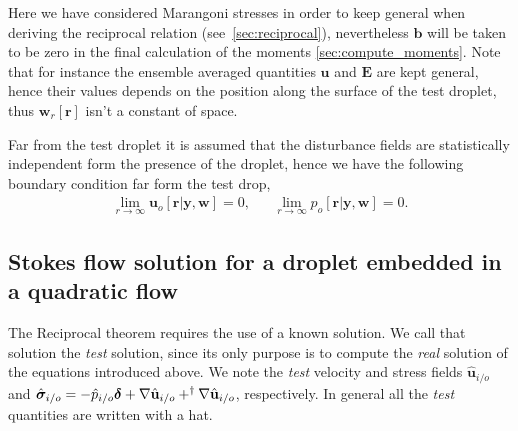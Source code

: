 Here we have considered Marangoni stresses in order to keep general when deriving the reciprocal relation (see~\ref{sec:reciprocal}), nevertheless $\textbf{b}$ will be taken to be zero in the final calculation of the moments \eqref{sec:compute_moments}. 
Note that for instance the ensemble averaged quantities $\textbf{u}$ and $\textbf{E}$ are kept general, hence their values depends on the position along the surface of the test droplet, thus $\textbf{w}_r[\textbf{r}]$ isn't a constant of space. 



Far from the test droplet it is assumed that the disturbance fields are statistically independent form the presence of the droplet, hence we have the following boundary condition far form the test drop,  
\begin{align}
    \lim_{r \to\infty }\textbf{u}_{o}[\textbf{r}|\textbf{y},\textbf{w}] = 0,
    && \lim_{r \to\infty }p_{o}[\textbf{r}|\textbf{y},\textbf{w}]= 0. 
    \label{eq:BC_r_infty_1}
\end{align}





\subsection{Stokes flow solution for a droplet embedded in a quadratic flow}
The Reciprocal theorem requires the use of a known solution.
We call that solution the \textit{test} solution, since its only purpose is to compute the \textit{real} solution of the equations introduced above. 
We note the \textit{test} velocity and stress fields $\hat{\textbf{u}}_{i/o}$ and $\hat{\bm\sigma}_{i/o} = - \hat{p}_{i/o}\bm\delta + \mathbf{\nabla} \hat{\textbf{u}}_{i/o} + ^\dagger\mathbf{\nabla} \hat{\textbf{u}}_{i/o}$, respectively. 
In general all the \textit{test} quantities are written with a hat. 

